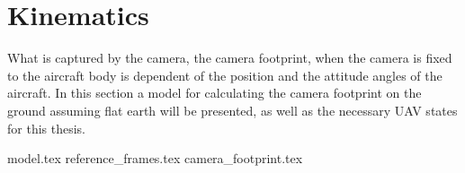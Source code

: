 \chapter{Kinematics}
\label{ch:kinematics}

What is captured by the camera, the camera footprint, when the camera is fixed to the aircraft body is dependent of the position and the attitude angles of the aircraft. In this section a model for calculating the camera footprint on the ground assuming flat earth will be presented, as well as the necessary UAV states for this thesis.


{model.tex}
{reference_frames.tex}
{camera_footprint.tex}
